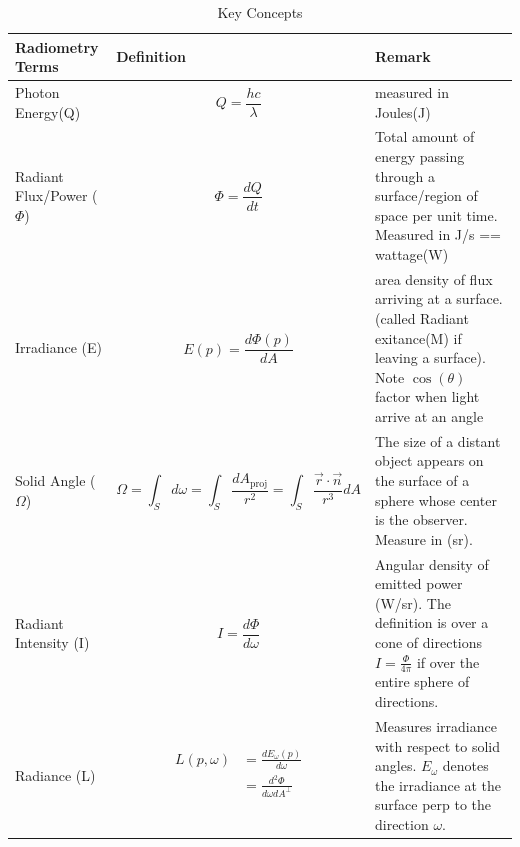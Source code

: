 \documentclass[UTF8]{ctexart}
\begin{document}
\begin{table}[h]
	\centering
	\caption{Key Concepts}
	\begin{tabularx}{\textwidth}{| l | X | X |} %
		\hline
		\textbf{Radiometry Terms} & \textbf{Definition} & \textbf{Remark} \\
		\hline
		Photon Energy(Q) &  $$Q = \frac{hc}{\lambda}$$ & measured in Joules(J) \\
		\hline
		Radiant Flux/Power  ($\Phi$) &  $$\Phi = \frac{dQ}{dt}$$ &  Total amount of energy passing through a surface/region of space per unit time. Measured in J/s == wattage(W)\\
		\hline
	    Irradiance (E) &  $$E(p) = \frac{d\Phi(p)}{dA}$$ & area density of flux arriving at a surface. (called Radiant exitance(M) if leaving a surface). Note $\cos(\theta)$ factor when light arrive at an angle  \\
		\hline
		Solid Angle ($\Omega$) & $$\Omega = \int_S d\omega = \int_S \frac{dA_{\text{proj}}}{r^2} =  \int_S \frac{\vec{r}\cdot\vec{n}}{r^3} dA $$ & The size of a distant object appears on the surface of a sphere whose center is the observer. Measure in (sr).   \\
		\hline
		Radiant Intensity (I) &  $$I = \frac{d\Phi}{d\omega}$$ & Angular density of emitted power (W/sr). The definition is over a cone of directions  $I=\frac{\Phi}{4\pi}$ if over the entire sphere of directions. \\
		\hline
		Radiance (L) & $$\begin{aligned}
			 L(p, \omega) &= \frac{dE_{\omega}(p)}{d\omega} \\
			     &= \frac{d^2\Phi}{d\omega d A^\perp} \\
		\end{aligned} $$  & Measures irradiance with respect to solid angles. $E_\omega$ denotes the irradiance at the surface perp to the direction $\omega$. \\
	\end{tabularx}
\end{table}
\end{document}

